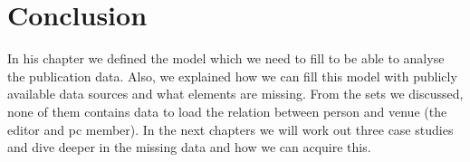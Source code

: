 \documentclass{ou-report}
\begin{document}









\section{Conclusion}
In his chapter we defined the model which we need to fill to be able to 
analyse the publication data. Also, we explained how we can fill this model
with publicly available data sources and what elements are missing. From the 
sets we discussed, none of them contains data to load the relation between 
person and venue (the editor and pc member).
In the next chapters we will work out three case studies and dive deeper in 
the missing data and how we can acquire this.
\end{document}
